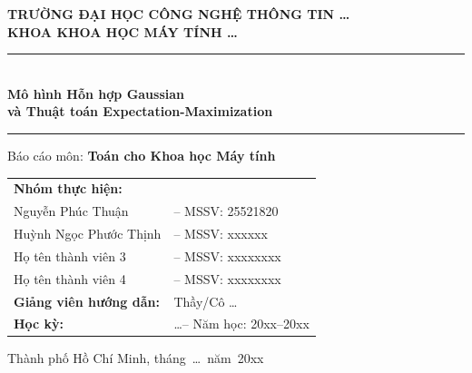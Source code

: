 \documentclass[12pt, a4paper]{article}
\begin{document}

\begin{titlepage}
  \centering
  \vspace*{1cm}

  {\Large\bfseries TRƯỜNG ĐẠI HỌC CÔNG NGHỆ THÔNG TIN \ldots\\[4pt]
   KHOA KHOA HỌC MÁY TÍNH \ldots}

  \vspace{1.5cm}
  \rule{\linewidth}{1.5pt}\\[6pt]
  {\LARGE\bfseries Mô hình Hỗn hợp Gaussian\\[6pt]
   và Thuật toán Expectation-Maximization}\\[6pt]
  \rule{\linewidth}{1.5pt}

  \vspace{1cm}
  {\large Báo cáo môn: \textbf{Toán cho Khoa học Máy tính}}

  \vspace{2cm}
  \begin{tabular}{ll}
    \textbf{Nhóm thực hiện:} & \\[4pt]
    \quad Nguyễn Phúc Thuận & -- MSSV: 25521820 \\
    \quad Huỳnh Ngọc Phước Thịnh & -- MSSV: xxxxxx \\
    \quad Họ tên thành viên 3 & -- MSSV: xxxxxxxx \\
    \quad Họ tên thành viên 4 & -- MSSV: xxxxxxxx \\[8pt]
    \textbf{Giảng viên hướng dẫn:} & Thầy/Cô \ldots \\[8pt]
    \textbf{Học kỳ:}  & \ldots -- Năm học: 20xx--20xx \\
  \end{tabular}

  \vfill
  {\large Thành phố Hồ Chí Minh, tháng~\ldots~năm~20xx}
\end{titlepage}

\begin{abstract}
  \noindent
  Báo cáo này trình bày lý thuyết và ứng dụng của Mô hình Hỗn hợp Gaussian
  (Gaussian Mixture Model – GMM) và thuật toán Expectation-Maximization (EM).
  Chúng tôi bắt đầu từ nền tảng toán học cần thiết, xây dựng mô hình GMM,
  suy dẫn đầy đủ các bước E-step và M-step, phân tích tính hội tụ, rồi so sánh
  GMM với phương pháp phân cụm $k$-means.
  Phần thực nghiệm minh họa hoạt động của thuật toán trên các bộ dữ liệu tổng hợp
  và thực tế, kèm theo phân tích định lượng.

  \medskip\noindent
  \textbf{Từ khóa:} Mô hình hỗn hợp Gaussian, Thuật toán EM,
  Phân cụm mềm, Biến ẩn, Hội tụ log-likelihood.
\end{abstract}
\end{document}
